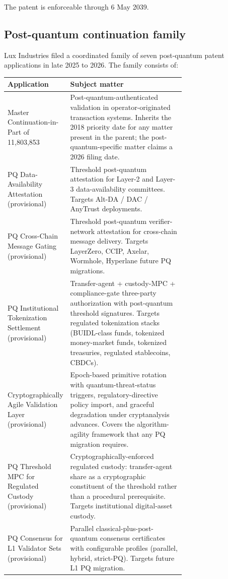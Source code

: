 \documentclass[11pt,letterpaper]{article}
\begin{document}
The patent is enforceable through 6 May 2039.

\subsection{Post-quantum continuation family}

Lux Industries filed a coordinated family of seven post-quantum patent applications in late 2025 to 2026. The family consists of:

\begin{longtable}{lp{0.7\linewidth}}
\toprule
\textbf{Application} & \textbf{Subject matter} \\
\midrule
Master Continuation-in-Part of 11{,}803{,}853 & Post-quantum-authenticated validation in operator-originated transaction systems. Inherits the 2018 priority date for any matter present in the parent; the post-quantum-specific matter claims a 2026 filing date. \\
PQ Data-Availability Attestation (provisional) & Threshold post-quantum attestation for Layer-2 and Layer-3 data-availability committees. Targets Alt-DA / DAC / AnyTrust deployments. \\
PQ Cross-Chain Message Gating (provisional) & Threshold post-quantum verifier-network attestation for cross-chain message delivery. Targets LayerZero, CCIP, Axelar, Wormhole, Hyperlane future PQ migrations. \\
PQ Institutional Tokenization Settlement (provisional) & Transfer-agent + custody-MPC + compliance-gate three-party authorization with post-quantum threshold signatures. Targets regulated tokenization stacks (BUIDL-class funds, tokenized money-market funds, tokenized treasuries, regulated stablecoins, CBDCs). \\
Cryptographically Agile Validation Layer (provisional) & Epoch-based primitive rotation with quantum-threat-status triggers, regulatory-directive policy import, and graceful degradation under cryptanalysis advances. Covers the algorithm-agility framework that any PQ migration requires. \\
PQ Threshold MPC for Regulated Custody (provisional) & Cryptographically-enforced regulated custody: transfer-agent share as a cryptographic constituent of the threshold rather than a procedural prerequisite. Targets institutional digital-asset custody. \\
PQ Consensus for L1 Validator Sets (provisional) & Parallel classical-plus-post-quantum consensus certificates with configurable profiles (parallel, hybrid, strict-PQ). Targets future L1 PQ migration. \\
\bottomrule
\end{longtable}
\end{document}
